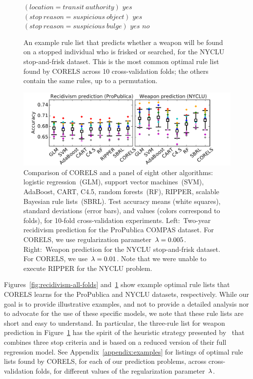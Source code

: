 \begin{figure}[t!]
\begin{algorithmic}
\State \bif $(location = transit~authority)$ \bthen $yes$
\State \belif $(stop~reason = suspicious~object)$ \bthen $yes$
\State \belif $(stop~reason = suspicious~bulge)$ \bthen $yes$
\State \belse $no$
\end{algorithmic}
\caption{An example rule list that predicts whether a weapon will be found on a
stopped individual who is frisked or searched, for the NYCLU stop-and-frisk dataset.
%
This is the most common optimal rule list found by CORELS across 10 cross-validation
folds; the others contain the same rules, up to a permutation.
}
\label{fig:weapon-rule-list}
\end{figure}

\begin{figure}[t!]
\begin{center}
\includegraphics[trim={10mm, 5mm, 15mm, 5mm},
width=\textwidth]{figs/compare-compas-weapon.pdf}
\end{center}
\caption{Comparison of CORELS and a panel of eight other algorithms:
logistic regression~(GLM), support vector machines~(SVM),
AdaBoost, CART, C4.5, random forests~(RF), RIPPER,
scalable Bayesian rule lists~(SBRL).
%
Test accuracy means (white squares),
standard deviations (error bars),
and values (colors correspond to folds),
for 10-fold cross-validation experiments.
%
Left:~Two-year recidivism prediction for the ProPublica COMPAS dataset.
%
For CORELS, we use regularization parameter~${{\lambda}=0.005}$.
%
Right:~Weapon prediction for the NYCLU stop-and-frisk dataset.
%
For CORELS, we use~${{\lambda}=0.01}$.
%
Note that we were unable to execute RIPPER for the NYCLU problem.
}
\label{fig:comparison}
\end{figure}

Figures~\ref{fig:recidivism-all-folds} and~\ref{fig:weapon-rule-list}
show example optimal rule lists that CORELS learns
for the ProPublica and NYCLU datasets, respectively.
%
While our goal is to provide illustrative examples, and not to provide a
detailed analysis nor to advocate for the use of these specific models,
we note that these rule lists are short and easy to understand.
%
In particular, the three-rule list for weapon prediction
in Figure~\ref{fig:weapon-rule-list} has the spirit of the heuristic
strategy presented by~\citet{Goel16} that combines three stop criteria
and is based on a reduced version of their full regression model.
%
See Appendix~\ref{appendix:examples} for listings of optimal rule lists found
by CORELS, for each of our prediction problems, across cross-validation folds,
for different values of the regularization parameter~${\lambda}$.

